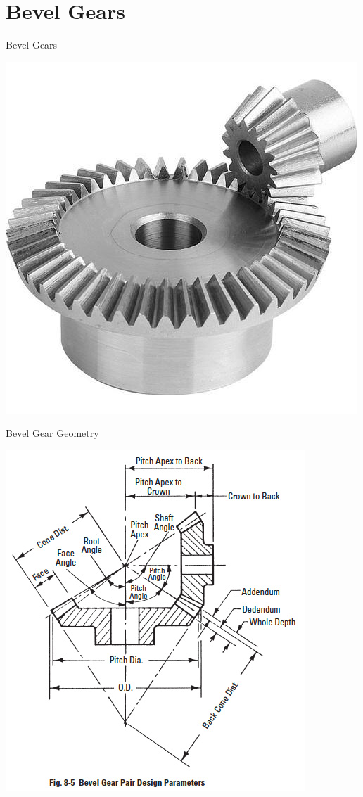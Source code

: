 \documentclass[10pt, svgnames]{beamer}
\begin{document}
\section{Bevel Gears}
\label{bevel-gears}
\begin{frame}[label={sec:org0de6cf6}]{Bevel Gears}
\begin{center}
\includegraphics[height=0.8\textheight]{pictures/bevel-pair.png}
\end{center}
\end{frame}

\begin{frame}[label={sec:org95a32c9}]{Bevel Gear Geometry}
\begin{center}
\includegraphics[width=.9\linewidth]{pictures/bevel-geometry2.jpg}
\end{center}
\end{frame}
\end{document}

